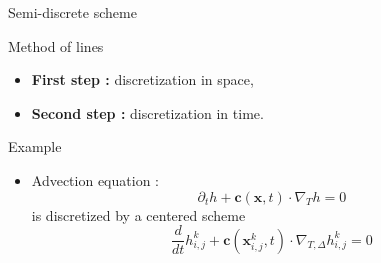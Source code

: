\documentclass[11pt]{beamer}
\begin{document}

%
%
%


\begin{frame}{Semi-discrete scheme}
\begin{block}{Method of lines}
\begin{itemize}
\item \textbf{First step :} discretization in space,
\item \textbf{Second step :} discretization in time.
\end{itemize}
\end{block}

\begin{block}{Example}
\begin{itemize}
\item Advection equation :
$$\partial_t h + \mathbf{c}(\mathbf{x},t) \cdot \nabla_T h = 0$$
is discretized by a centered scheme
$$\dfrac{d}{dt} h_{i,j}^k + \mathbf{c}(\mathbf{x}_{i,j}^k,t) \cdot \nabla_{T,\Delta} h_{i,j}^k = 0$$
\end{itemize}
\end{block}
\end{frame}
\end{document}
